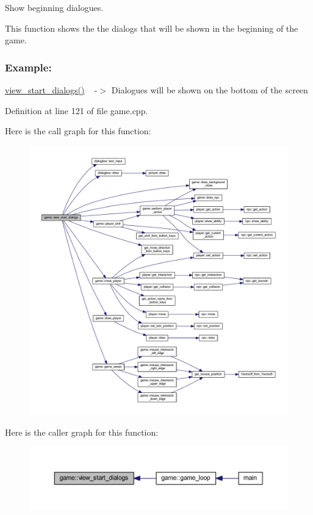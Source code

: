 Show beginning dialogues. 

This function shows the the dialogs that will be shown in the beginning of the game.~\newline


\subsubsection*{Example\+: }

\hyperlink{classgame_af99a7ac774385373a015bd3082049bd2}{view\+\_\+start\+\_\+dialogs()} ~\newline
-\/$>$ Dialogues will be shown on the bottom of the screen 

Definition at line 121 of file game.\+cpp.

Here is the call graph for this function\+:
\nopagebreak
\begin{figure}[H]
\begin{center}
\leavevmode
\includegraphics[width=350pt]{classgame_af99a7ac774385373a015bd3082049bd2_cgraph}
\end{center}
\end{figure}
Here is the caller graph for this function\+:
\nopagebreak
\begin{figure}[H]
\begin{center}
\leavevmode
\includegraphics[width=350pt]{classgame_af99a7ac774385373a015bd3082049bd2_icgraph}
\end{center}
\end{figure}


